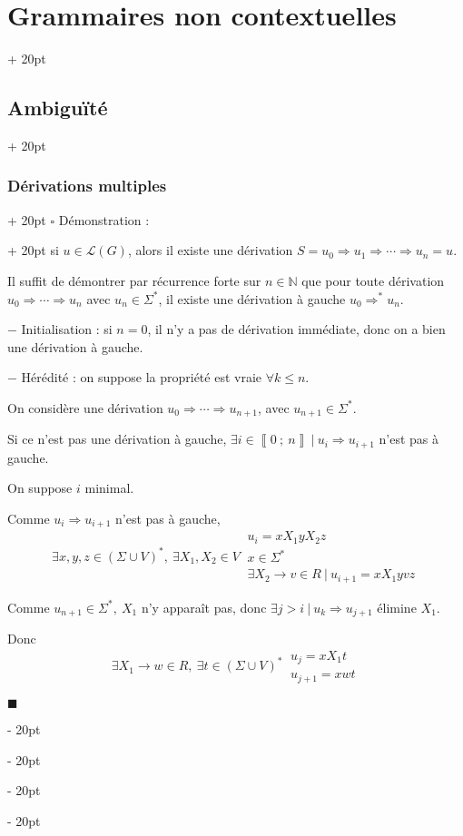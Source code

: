 \documentclass[a4paper, 12pt, twoside]{article}
\newcommand{\N}{\mathbb{N}} %
\newcommand{\nset}[2]{\left\llbracket #1\ ;\ #2 \right\rrbracket}
\newcommand{\lr}[1]{\left( #1 \right)}
\renewcommand{\le}{\leqslant}
\newcommand{\ind}[1][20pt]{\advance\leftskip + #1}
\newcommand{\deind}[1][20pt]{\advance\leftskip - #1}
\newenvironment{indt}[2][20pt]{#2 \par \ind[#1]}{\par \deind} %
\newenvironment{proof}[1][{Démonstration :}]{\begin{indt}{$\square$ #1}}{$\blacksquare$ \end{indt}}
\begin{document}
\begin{indt}{\section{Grammaires non contextuelles}}
\begin{indt}{\subsection{Ambiguïté}}
\begin{indt}{\subsubsection{Dérivations multiples}}
\begin{proof}
                    \boxed{\Rightarrow} si $u \in \mathcal L(G)$, alors il existe une dérivation $S = u_0 \Rightarrow u_1 \Rightarrow \cdots \Rightarrow u_n = u$.

                    Il suffit de démontrer par récurrence forte sur $n \in \N$ que pour toute dérivation $u_0 \Rightarrow \cdots \Rightarrow u_n$ avec $u_n \in \Sigma^*$, il existe une dérivation à gauche $u_0 \Rightarrow^* u_n$.

                    \vspace{6pt}
                    
                    $-$ Initialisation : si $n = 0$, il n'y a pas de dérivation immédiate, donc on a bien une dérivation à gauche.

                    \vspace{6pt}
                    
                    $-$ Hérédité : on suppose la propriété est vraie $\forall k \le n$.

                    On considère une dérivation $u_0 \Rightarrow \cdots \Rightarrow u_{n + 1}$, avec $u_{n + 1} \in \Sigma^*$.

                    Si ce n'est pas une dérivation à gauche, $\exists i \in \nset 0 n\ |\ u_i \Rightarrow u_{i + 1}$ n'est pas à gauche.

                    On suppose $i$ minimal.

                    Comme $u_i \Rightarrow u_{i + 1}$ n'est pas à gauche,
                    \[
                        \exists x, y, z \in \lr{\Sigma \cup V}^*,\
                        \exists X_1, X_2 \in V\
                        \begin{array}{|l}
                            u_i = x X_1 y X_2 z
                            \\
                            x \in \Sigma^*
                            \\
                            \exists X_2 \rightarrow v \in R\ |\ u_{i + 1} = x X_1 yvz
                        \end{array}
                    \]

                    Comme $u_{n + 1} \in \Sigma^*,\ X_1$ n'y apparaît pas, donc $\exists j > i\ |\ u_k \Rightarrow u_{j + 1}$ élimine $X_1$.

                    Donc
                    \[
                        \exists X_1 \rightarrow w \in R,\
                        \exists t \in \lr{\Sigma \cup V}^*\
                        \begin{array}{|l}
                            u_j = x X_1 t
                            \\
                            u_{j + 1} = x w t
                        \end{array}
                    \]


\end{proof}
\end{indt}
\end{indt}
\end{indt}
\end{document}
